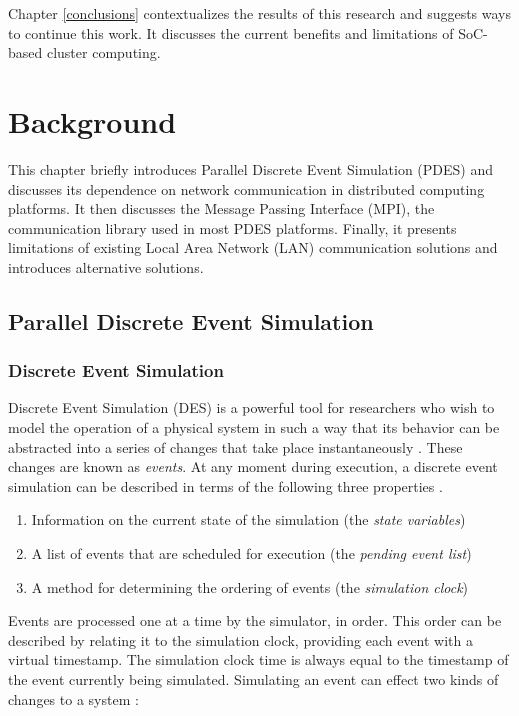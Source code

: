 \documentclass[11pt]{book}
\begin{document}
Chapter \ref{conclusions} contextualizes the results of this research and suggests ways to
continue this work. It discusses the current benefits and limitations of SoC-based cluster
computing.

\newpage
\chapter{Background}
\label{background}

This chapter briefly introduces Parallel Discrete Event Simulation (PDES) and
discusses its dependence on network communication in distributed computing
platforms. It then discusses the Message Passing Interface (MPI), the
communication library used in most PDES platforms. Finally, it presents
limitations of existing Local Area Network (LAN) communication solutions and
introduces alternative solutions.

\section{\textbf{Parallel Discrete Event Simulation}}

\subsection{\textbf{Discrete Event Simulation}}

Discrete Event Simulation (DES) is a powerful tool for researchers who wish to
model the operation of a physical system in such a way that its behavior can be
abstracted into a series of changes that take place instantaneously
\cite{jacob-13}. These changes are known as \textit{events}. At any moment
during execution, a discrete event simulation can be described in terms of the
following three properties \cite{fujimoto-pdes} \cite{jacob-13} \cite{page-94}.

\begin{enumerate}
  \item Information on the current state of the simulation (the \textit{state variables})
  \item A list of events that are scheduled for execution (the \textit{pending
    event list})
  \item A method for determining the ordering of events (the \textit{simulation
    clock})
\end{enumerate}

Events are processed one at a time by the simulator, in order. This order can be
described by relating it to the simulation clock, providing each event with a
virtual timestamp. The simulation clock time is always equal to the timestamp of
the event currently being simulated. Simulating an event can effect two kinds of
changes to a system \cite{fujimoto-pdes}:
\end{document}
